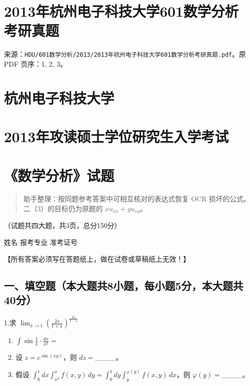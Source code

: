 \documentclass[11pt,fontset=fandol]{ctexart}
\begin{document}
\section{2013年杭州电子科技大学601数学分析考研真题}\label{ux5e74ux676dux5ddeux7535ux5b50ux79d1ux6280ux5927ux5b66601ux6570ux5b66ux5206ux6790ux8003ux7814ux771fux9898}

来源：\texttt{HDU/601数学分析/2013/2013年杭州电子科技大学601数学分析考研真题.pdf}。原
PDF 页序：1, 2, 3。

\section{杭州电子科技大学}\label{ux676dux5ddeux7535ux5b50ux79d1ux6280ux5927ux5b66}

\section{2013年攻读硕士学位研究生入学考试}\label{ux5e74ux653bux8bfbux7855ux58ebux5b66ux4f4dux7814ux7a76ux751fux5165ux5b66ux8003ux8bd5}

\section{《数学分析》试题}\label{ux6570ux5b66ux5206ux6790ux8bd5ux9898}

\begin{quote}
助手整理：按同题参考答案中可相互核对的表达式恢复 OCR
损坏的公式。二（3）的目标仍为原题的 \(xu_{xx}+yu_{xy}\)。
\end{quote}

（试题共四大题，共3页，总分150分）

姓名 报考专业 准考证号

【所有答案必须写在答题纸上，做在试卷或草稿纸上无效！】

\subsection{一、填空题（本大题共8小题，每小题5分，本大题共40分）}\label{ux4e00ux586bux7a7aux9898ux672cux5927ux9898ux51718ux5c0fux9898ux6bcfux5c0fux98985ux5206ux672cux5927ux9898ux517140ux5206}

1.求
\(\lim _ { x \to 1 } \left( { \frac { 2 x } { 1 + x } } \right) ^ { \frac { 2 x } { 1 - x } }\)

\begin{enumerate}
\def\labelenumi{\arabic{enumi}.}
\setcounter{enumi}{1}
\item
  \(\int \sin { \frac { 1 } { x } } \cdot { \frac { d x } { x ^ { 2 } } } =\)
\item
  设 \(z=e^{\sin(xy)}\)，则 \(dz=\)\_\_\_\_。
\item
  假设
  \(\int_0^1dx\int_{x^2}^xf(x,y)\,dy=\int_0^1dy\int_y^{\varphi(y)}f(x,y)\,dx\)，则
  \(\varphi(y)=\)\_\_\_\_。
\end{enumerate}
\end{document}
